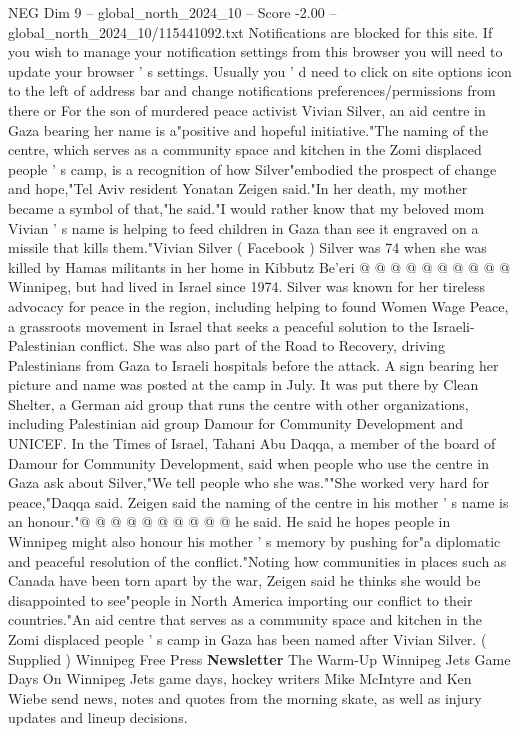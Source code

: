 \begin{textsample}{NEG Dim 9 – global\_north\_2024\_10 – Score -2.00 – global\_north\_2024\_10/115441092.txt}  \label{ex:f9_neg_235}
Notifications are blocked for this site.
If you wish to manage your notification settings from this browser you will need to update your browser ' s settings.
Usually you ' d need to click on site options icon to the left of address bar and change notifications preferences/permissions from there or For the son of murdered peace activist Vivian Silver, an aid centre in Gaza bearing her name is a"positive and hopeful initiative."The naming of the centre, which serves as a community space and kitchen in the Zomi displaced people ' s camp, is a recognition of how Silver"embodied the prospect of change and hope,"Tel Aviv resident Yonatan Zeigen said."In her death, my mother became a symbol of that,"he said."I would rather know that my beloved mom Vivian ' s name is helping to feed children in Gaza than see it engraved on a missile that kills them."Vivian Silver ( Facebook ) Silver was 74 when she was killed by Hamas militants in her home in Kibbutz Be'eri @ @ @ @ @ @ @ @ @ @ Winnipeg, but had lived in Israel since 1974.
Silver was known for her tireless advocacy for peace in the region, including helping to found Women Wage Peace, a grassroots movement in Israel that seeks a peaceful solution to the Israeli-Palestinian conflict.
She was also part of the Road to Recovery, driving Palestinians from Gaza to Israeli hospitals before the attack.
A sign bearing her picture and name was posted at the camp in July.
It was put there by Clean Shelter, a German aid group that runs the centre with other organizations, including Palestinian aid group Damour for Community Development and UNICEF.
In the Times of Israel, Tahani Abu Daqqa, a member of the board of Damour for Community Development, said when people who use the centre in Gaza ask about Silver,"We tell people who she was.""She worked very hard for peace,"Daqqa said.
Zeigen said the naming of the centre in his mother ' s name is an honour."@ @ @ @ @ @ @ @ @ @ he said.
He said he hopes people in Winnipeg might also honour his mother ' s memory by pushing for"a diplomatic and peaceful resolution of the conflict."Noting how communities in places such as Canada have been torn apart by the war, Zeigen said he thinks she would be disappointed to see"people in North America importing our conflict to their countries."An aid centre that serves as a community space and kitchen in the Zomi displaced people ' s camp in Gaza has been named after Vivian Silver. ( Supplied ) Winnipeg Free Press \textbf{Newsletter} The Warm-Up Winnipeg Jets Game Days On Winnipeg Jets game days, hockey writers Mike McIntyre and Ken Wiebe send news, notes and quotes from the morning skate, as well as injury updates and lineup decisions.

\end{textsample}
